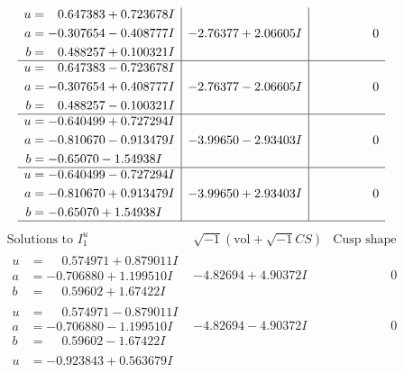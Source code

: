 \documentclass[1p]{elsarticle_modified}
\theoremstyle{definition}
\newcommand{\I}{\sqrt{-1}}
\begin{document}
$$\begin{array}{c|c|c}
\begin{aligned}
u &= \phantom{-}0.647383 + 0.723678 I \\
a &= -0.307654 - 0.408777 I \\
b &= \phantom{-}0.488257 + 0.100321 I\end{aligned}
 & -2.76377 + 2.06605 I & \phantom{-0.000000 } 0 \\ \hline\begin{aligned}
u &= \phantom{-}0.647383 - 0.723678 I \\
a &= -0.307654 + 0.408777 I \\
b &= \phantom{-}0.488257 - 0.100321 I\end{aligned}
 & -2.76377 - 2.06605 I & \phantom{-0.000000 } 0 \\ \hline\begin{aligned}
u &= -0.640499 + 0.727294 I \\
a &= -0.810670 - 0.913479 I \\
b &= -0.65070 - 1.54938 I\end{aligned}
 & -3.99650 - 2.93403 I & \phantom{-0.000000 } 0 \\ \hline\begin{aligned}
u &= -0.640499 - 0.727294 I \\
a &= -0.810670 + 0.913479 I \\
b &= -0.65070 + 1.54938 I\end{aligned}
 & -3.99650 + 2.93403 I & \phantom{-0.000000 } 0\\
 \hline 
 \end{array}$$\newpage$$\begin{array}{c|c|c}  
\text{Solutions to }I^u_{1}& \I (\text{vol} + \sqrt{-1}CS) & \text{Cusp shape}\\
 \hline 
\begin{aligned}
u &= \phantom{-}0.574971 + 0.879011 I \\
a &= -0.706880 + 1.199510 I \\
b &= \phantom{-}0.59602 + 1.67422 I\end{aligned}
 & -4.82694 + 4.90372 I & \phantom{-0.000000 } 0 \\ \hline\begin{aligned}
u &= \phantom{-}0.574971 - 0.879011 I \\
a &= -0.706880 - 1.199510 I \\
b &= \phantom{-}0.59602 - 1.67422 I\end{aligned}
 & -4.82694 - 4.90372 I & \phantom{-0.000000 } 0 \\ \hline\begin{aligned}
u &= -0.923843 + 0.563679 I \\

\end{aligned}
\end{array}$$
\end{document}
